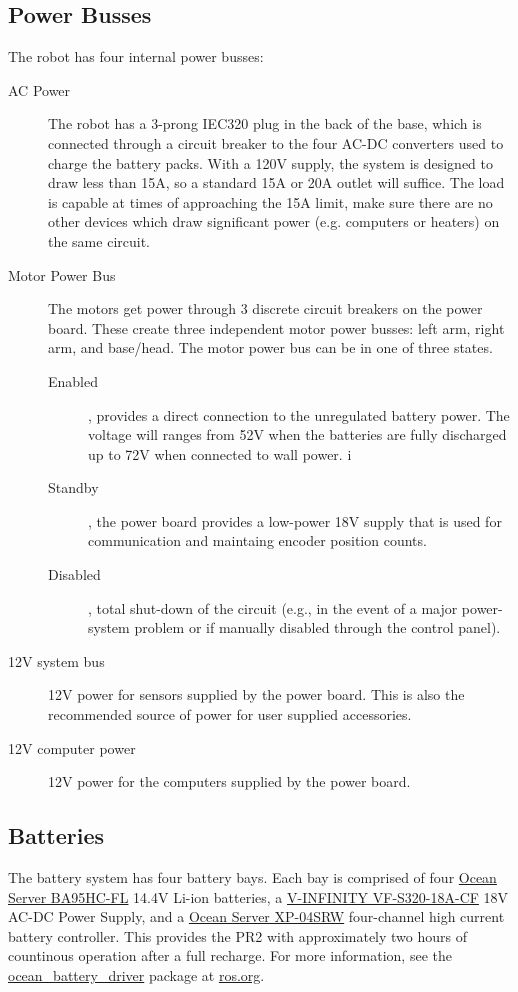 \subsection{Power Busses}
The robot has four internal power busses:
\begin{description}
\item[AC Power] The robot has a 3-prong IEC320 plug in the back of the base, which
  is connected through a circuit breaker to the four AC-DC converters used to
  charge the battery packs.  With a 120V supply, the system is designed to draw less than 15A, so a
  standard 15A or 20A outlet will suffice. The load is capable at times of
  approaching the 15A limit, make sure there are no other devices which draw
  significant power (e.g. computers or heaters) on the same circuit.
\item[Motor Power Bus] The motors get power through 3 discrete circuit breakers
  on the power board.  These create three independent motor power busses: left
  arm, right arm, and base/head.  The motor power bus can be in one of three
  states.
\begin{description}
\item[Enabled], provides a direct connection to the unregulated
  battery power. The voltage will ranges from 52V when the batteries are fully
  discharged up to 72V when connected to wall power.  i
\item[Standby], the power
  board provides a low-power 18V supply that is used for communication and
  maintaing encoder position counts.
\item[Disabled], total shut-down of the
  circuit (e.g., in the event of a major power-system problem or if manually
  disabled through the control panel).
\end{description}
\item[12V system bus] 12V power for sensors supplied by the power board. This is
  also the recommended source of power for user supplied accessories.
\item[12V computer power] 12V power for the computers supplied by the power
  board.
\end{description}
\subsection{Batteries}
The battery system has four battery bays.  Each bay is comprised of four
\href{http://www.oceanserver-store.com/18.html}{Ocean Server BA95HC-FL} 14.4V
Li-ion batteries, a
\href{http://www.v-infinity.com/adtemplate_child.asp?c=710918&p=903285&catky=764537&subcatky1=46887&subcatky2=320934}{V-INFINITY
  VF-S320-18A-CF} 18V AC-DC Power Supply, and a
\href{http://www.oceanserver-store.com/xpmibamamo.html}{Ocean Server XP-04SRW}
four-channel high current battery controller. This provides the PR2 with
approximately two hours of countinous operation after a full recharge.  For more
information, see the \href{http://www.ros.org/wiki/ocean\_battery\_driver}{ocean\_battery\_driver}
package at \href{http://www.ros.org}{ros.org}.

